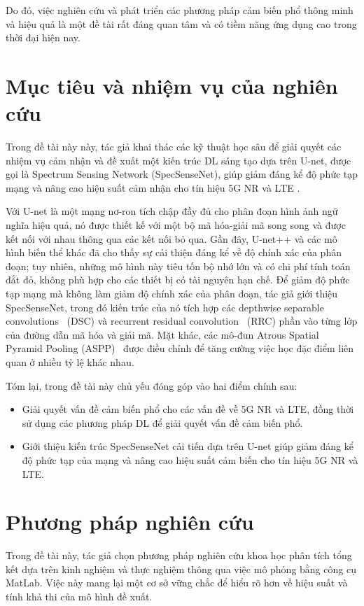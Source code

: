 Do đó, việc nghiên cứu và phát triển các phương pháp cảm biến phổ thông minh và hiệu quả là một đề tài rất đáng quan tâm và có tiềm năng ứng dụng cao trong thời đại hiện nay.


\section{Mục tiêu và nhiệm vụ của nghiên cứu}
Trong đề tài này này, tác giả khai thác các kỹ thuật học sâu để giải quyết các nhiệm vụ cảm nhận và đề xuất một kiến trúc DL sáng tạo dựa trên U-net, được gọi là Spectrum Sensing Network (SpecSenseNet), giúp giảm đáng kể độ phức tạp mạng và nâng cao hiệu suất cảm nhận cho tín hiệu 5G NR và LTE \cite{ronneberger2015u,zhou2019Unet++}.

Với U-net là một mạng nơ-ron tích chập đầy đủ cho phân đoạn hình ảnh ngữ nghĩa hiệu quả, nó được thiết kế với một bộ mã hóa-giải mã song song và được kết nối với nhau thông qua các kết nối bỏ qua. Gần đây, U-net++ và các mô hình biến thể khác đã cho thấy sự cải thiện đáng kể về độ chính xác của phân đoạn; tuy nhiên, những mô hình này tiêu tốn bộ nhớ lớn và có chi phí tính toán đắt đỏ, không phù hợp cho các thiết bị có tài nguyên hạn chế. Để giảm độ phức tạp mạng mà không làm giảm độ chính xác của phân đoạn, tác giả giới thiệu SpecSenseNet, trong đó kiến trúc của nó tích hợp các depthwise separable convolutions~\cite{CholletXception} (DSC) và recurrent residual convolution~\cite{AlomNuclei, he2016deep, aghalari2021brain} (RRC) phần vào từng lớp của đường dẫn mã hóa và giải mã. Mặt khác, các mô-đun Atrous Spatial Pyramid Pooling (ASPP)~\cite{ChenAtrous} được điều chỉnh để tăng cường việc học đặc điểm liên quan ở nhiều tỷ lệ khác nhau.

Tóm lại, trong đề tài này chủ yếu đóng góp vào hai điểm chính sau:

\begin{itemize}
\item Giải quyết vấn đề cảm biến phổ cho các vấn đề về 5G NR và LTE, đồng thời sử dụng các phương pháp DL để giải quyết vấn đề cảm biến phổ.
\item Giới thiệu kiến trúc SpecSenseNet cải tiến dựa trên U-net giúp giảm đáng kể độ phức tạp của mạng và nâng cao hiệu suất cảm biến cho tín hiệu 5G NR và LTE.
\end{itemize}

\section{Phương pháp nghiên cứu}
Trong đề tài này, tác giả chọn phương pháp nghiên cứu khoa học phân tích tổng kết dựa trên kinh nghiệm và thực nghiệm thông qua việc mô phỏng bằng công cụ MatLab. Việc này mang lại một cơ sở vững chắc để hiểu rõ hơn về hiệu suất và tính khả thi của mô hình đề xuất.

